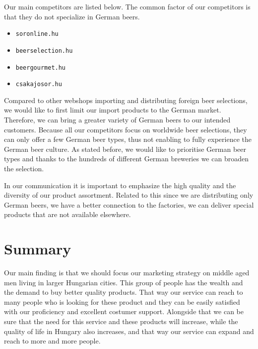Our main competitors are listed below. The common factor of our competitors is that they do not specialize in German beers.
\begin{itemize}
   \item \texttt{soronline.hu} \cite{soronline}
   \item \texttt{beerselection.hu} \cite{beerselection}
   \item \texttt{beergourmet.hu} \cite{beergourmet}
   \item \texttt{csakajosor.hu} \cite{csakajosor}
\end{itemize}
Compared to other webshops importing and distributing foreign beer selections, we would like to first limit our import products to the German market. Therefore, we can bring a greater variety of German beers to our intended customers. Because all our competitors focus on worldwide beer selections, they can only offer a few German beer types, thus not enabling to fully experience the German beer culture. As stated before, we would like to prioritise German beer types and thanks to the hundreds of different German breweries we can broaden the selection.

In our communication it is important to emphasize the high quality and the diversity of our product assortment. Related to this since we are distributing only German beers, we have a better connection to the factories, we can deliver special products that are not available elsewhere.


\section{Summary}
Our main finding is that we should focus our marketing strategy on middle aged men living in larger Hungarian cities. This group of people has the wealth and the demand to buy better quality products. That way our service can reach to many people who is looking for these product and they can be easily satisfied with our proficiency and excellent costumer support. Alongside that we can be sure that the need for this service and these products will increase, while the quality of life in Hungary also increases, and that way our service can expand and reach to more and more people.


\newpage
\renewcommand{\baselinestretch}{1}

